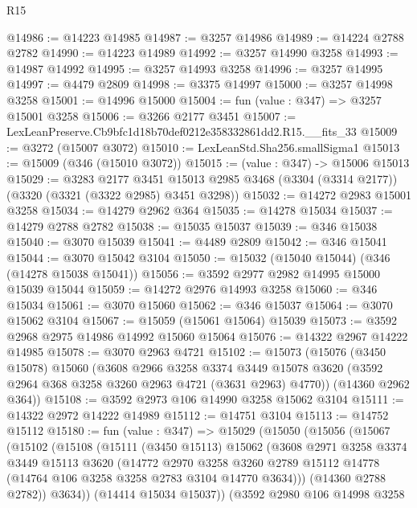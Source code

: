 \begin{lexlean}{R15}
\begin{coremodule}
@14986 := @14223 @14985
@14987 := @3257 @14986
@14989 := @14224 @2788 @2782
@14990 := @14223 @14989
@14992 := @3257 @14990 @3258
@14993 := @14987 @14992
@14995 := @3257 @14993 @3258
@14996 := @3257 @14995
@14997 := @4479 @2809
@14998 := @3375 @14997
@15000 := @3257 @14998 @3258
@15001 := @14996 @15000
@15004 := fun (value : @347) => @3257 @15001 @3258
@15006 := @3266 @2177 @3451
@15007 := LexLeanPreserve.Cb9bfc1d18b70def0212e358332861dd2.R15.__fits_33
@15009 := @3272 (@15007 @3072)
@15010 := LexLeanStd.Sha256.smallSigma1
@15013 := @15009 (@346 (@15010 @3072))
@15015 := (value : @347) -> @15006 @15013
@15029 := @3283
    @2177
    @3451
    @15013
    @2985
    @3468
    (@3304 (@3314 @2177))
    (@3320 (@3321 (@3322 @2985) @3451 @3298))
@15032 := @14272 @2983 @15001 @3258
@15034 := @14279 @2962 @364
@15035 := @14278 @15034
@15037 := @14279 @2788 @2782
@15038 := @15035 @15037
@15039 := @346 @15038
@15040 := @3070 @15039
@15041 := @4489 @2809
@15042 := @346 @15041
@15044 := @3070 @15042 @3104
@15050 := @15032 (@15040 @15044) (@346 (@14278 @15038 @15041))
@15056 := @3592 @2977 @2982 @14995 @15000 @15039 @15044
@15059 := @14272 @2976 @14993 @3258
@15060 := @346 @15034
@15061 := @3070 @15060
@15062 := @346 @15037
@15064 := @3070 @15062 @3104
@15067 := @15059 (@15061 @15064) @15039
@15073 := @3592 @2968 @2975 @14986 @14992 @15060 @15064
@15076 := @14322 @2967 @14222 @14985
@15078 := @3070 @2963 @4721
@15102 := @15073
    (@15076
      (@3450 @15078)
      @15060
      (@3608
        @2966
        @3258
        @3374
        @3449
        @15078
        @3620
        (@3592 @2964 @368 @3258 @3260 @2963 @4721 (@3631 @2963) @4770))
      (@14360 @2962 @364))
@15108 := @3592 @2973 @106 @14990 @3258 @15062 @3104
@15111 := @14322 @2972 @14222 @14989
@15112 := @14751 @3104
@15113 := @14752 @15112
@15180 := fun (value : @347) =>
  @15029
    (@15050
      (@15056
        (@15067
          (@15102
            (@15108
              (@15111
                (@3450 @15113)
                @15062
                (@3608
                  @2971
                  @3258
                  @3374
                  @3449
                  @15113
                  @3620
                  (@14772
                    @2970
                    @3258
                    @3260
                    @2789
                    @15112
                    @14778
                    (@14764 @106 @3258 @3258 @2783 @3104 @14770 @3634)))
                (@14360 @2788 @2782))
              @3634))
          (@14414 @15034 @15037))
        (@3592
          @2980
          @106
          @14998
          @3258

\end{coremodule}
\end{lexlean}
